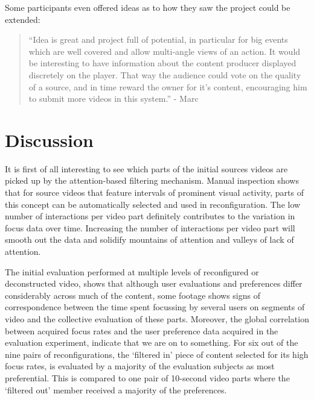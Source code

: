 Some participants even offered ideas as to how they saw the project could be extended:

\begin{quote}
  ``Idea is great and project full of potential, in particular for big events which are well covered and allow multi-angle views of an action. It would be interesting to have information about the content producer displayed discretely on the player. That way the audience could vote on the quality of a source, and in time reward the owner for it's content, encouraging him to submit more videos in this system.'' - Marc
\end{quote}



\section{Discussion} %
\label{sec:discussion}

It is first of all interesting to see which parts of the initial sources videos are picked up by the attention-based filtering mechanism. Manual inspection shows that for source videos that feature intervals of prominent visual activity, parts of this concept can be automatically selected and used in reconfiguration. The low number of interactions per video part definitely contributes to the variation in focus data over time. Increasing the number of interactions per video part will smooth out the data and solidify mountains of attention and valleys of lack of attention.

The initial evaluation performed at multiple levels of reconfigured or deconstructed video, shows that although user evaluations and preferences differ considerably across much of the content, some footage shows signs of correspondence between the time spent focussing by several users on segments of video and the collective evaluation of these parts. Moreover, the global correlation between acquired focus rates and the user preference data acquired in the evaluation experiment, indicate that we are on to something. For six out of the nine pairs of reconfigurations, the `filtered in' piece of content selected for its high focus rates, is evaluated by a majority of the evaluation subjects as most preferential. This is compared to one pair of 10-second video parts where the `filtered out' member received a majority of the preferences.








